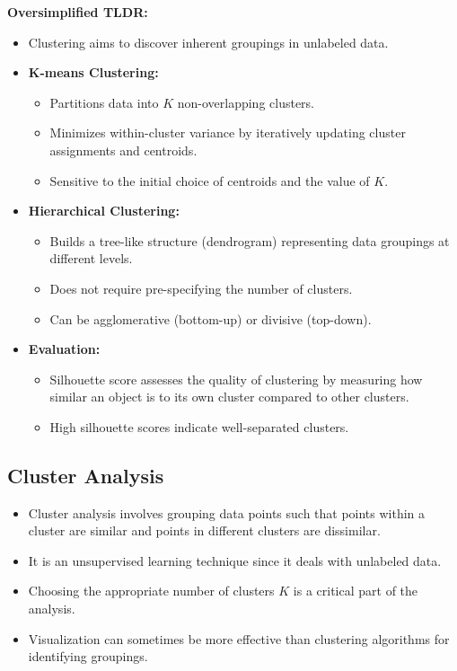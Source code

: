 \documentclass{article}
\begin{document}
\textbf{Oversimplified TLDR:}
\begin{itemize}
    \item Clustering aims to discover inherent groupings in unlabeled data.
    \item \textbf{K-means Clustering:}
    \begin{itemize}
        \item Partitions data into $K$ non-overlapping clusters.
        \item Minimizes within-cluster variance by iteratively updating cluster assignments and centroids.
        \item Sensitive to the initial choice of centroids and the value of $K$.
    \end{itemize}
    \item \textbf{Hierarchical Clustering:}
    \begin{itemize}
        \item Builds a tree-like structure (dendrogram) representing data groupings at different levels.
        \item Does not require pre-specifying the number of clusters.
        \item Can be agglomerative (bottom-up) or divisive (top-down).
    \end{itemize}
    \item \textbf{Evaluation:}
    \begin{itemize}
        \item Silhouette score assesses the quality of clustering by measuring how similar an object is to its own cluster compared to other clusters.
        \item High silhouette scores indicate well-separated clusters.
    \end{itemize}
\end{itemize}

\subsection{Cluster Analysis}

\begin{itemize}
    \item Cluster analysis involves grouping data points such that points within a cluster are similar and points in different clusters are dissimilar.
    \item It is an unsupervised learning technique since it deals with unlabeled data.
    \item Choosing the appropriate number of clusters $K$ is a critical part of the analysis.
    \item Visualization can sometimes be more effective than clustering algorithms for identifying groupings.
\end{itemize}
\end{document}
